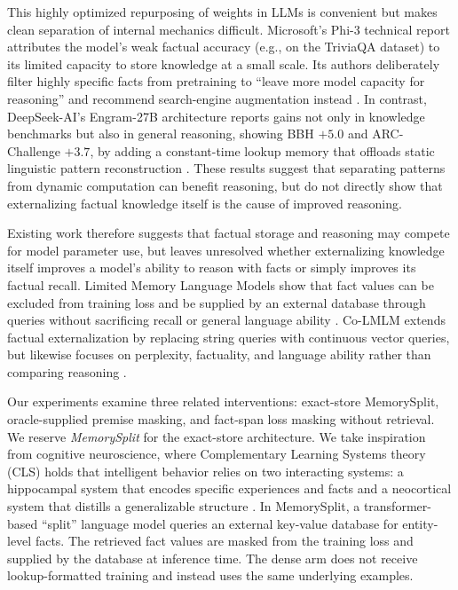 \documentclass{article}
\begin{document}
This highly optimized repurposing of weights in LLMs is convenient but makes clean separation of internal mechanics difficult. Microsoft's Phi-3 technical report attributes the model's weak factual accuracy (e.g., on the TriviaQA dataset) to its limited capacity to store knowledge at a small scale. Its authors deliberately filter highly specific facts from pretraining to ``leave more model capacity for reasoning'' and recommend search-engine augmentation instead \citep{abdin2024phi3}. In contrast, DeepSeek-AI's Engram-27B architecture reports gains not only in knowledge benchmarks but also in general reasoning, showing BBH $+5.0$ and ARC-Challenge $+3.7$, by adding a constant-time lookup memory that offloads static linguistic pattern reconstruction \citep{cheng2026engram}. These results suggest that separating patterns from dynamic computation can benefit reasoning, but do not directly show that externalizing factual knowledge itself is the cause of improved reasoning.

Existing work therefore suggests that factual storage and reasoning may compete for model parameter use, but leaves unresolved whether externalizing knowledge itself improves a model's ability to reason with facts or simply improves its factual recall. Limited Memory Language Models show that fact values can be excluded from training loss and be supplied by an external database through queries without sacrificing recall or general language ability \citep{zhao2025lmlm}. Co-LMLM extends factual externalization by replacing string queries with continuous vector queries, but likewise focuses on perplexity, factuality, and language ability rather than comparing reasoning \citep{feldman2026colmlm}.

Our experiments examine three related interventions: exact-store MemorySplit, oracle-supplied premise masking, and fact-span loss masking without retrieval. We reserve \emph{MemorySplit} for the exact-store architecture. We take inspiration from cognitive neuroscience, where Complementary Learning Systems theory (CLS) holds that intelligent behavior relies on two interacting systems: a hippocampal system that encodes specific experiences and facts and a neocortical system that distills a generalizable structure \citep{mcclelland1995cls}. In MemorySplit, a transformer-based ``split'' language model queries an external key-value database for entity-level facts. The retrieved fact values are masked from the training loss and supplied by the database at inference time. The dense arm does not receive lookup-formatted training and instead uses the same underlying examples.
\end{document}
